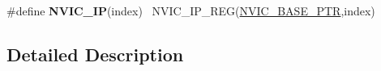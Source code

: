 \begin{DoxyCompactItemize}
\item 
\hypertarget{group___n_v_i_c___register___accessor___macros_gad215e21e79fd6c4c0b310324a51b0a34}{}\#define {\bfseries N\+V\+I\+C\+\_\+\+I\+P}(index)                                                  ~N\+V\+I\+C\+\_\+\+I\+P\+\_\+\+R\+E\+G(\hyperlink{group___n_v_i_c___peripheral_ga28f0a055d0c218e16d1fc7b13ff0caa5}{N\+V\+I\+C\+\_\+\+B\+A\+S\+E\+\_\+\+P\+T\+R},index)\label{group___n_v_i_c___register___accessor___macros_gad215e21e79fd6c4c0b310324a51b0a34}

\end{DoxyCompactItemize}


\subsection{Detailed Description}
